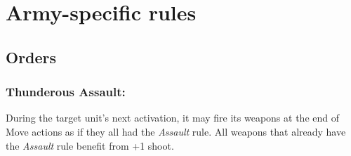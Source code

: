 \newcommand{\Autocannon}[1][3+]{\textbf{Autocannon}: R30 A2 {#1} D4 [Deadly 2, Heavy, Slow]}
\newcommand{\FragLauncher}[1][4+]{\textbf{Frag Launcher}: R20 A6 {#1} D1 [Area Effect, Heavy, Slow]}
\newcommand{\GatlingGun}[1][3+]{\textbf{Gatling Gun}: R20 A3 {#1} D4 [Heavy, Suppressive 2]}
\newcommand{\HeavyBattleRifle}[1][3+]{\textbf{Heavy Battle Rifle}: R30 A2 {#1} D3 [Heavy, Suppressive 1]}
\newcommand{\LaserCannon}[1][3+]{\textbf{Laser Cannon}: R40 {#1} D8 [Critical 9+, Deadly D10, Heavy, Slow]}
\newcommand{\MagmaCannon}[1][4+]{\textbf{Magma Cannon}: R16 {#1} D8 [Critical 8+, Deadly 2D5, Slow]}
\newcommand{\MissileLauncher}[1][3+]{\textbf{Missile Launcher}: R40 {#1} D6 [Deadly D10, Slow] or R40 A4 {#1} D1 [Area Effect, Heavy, Slow]}
\newcommand{\PlasmaCannon}[1][3+]{\textbf{Plasma Cannon}: R30 A3 {#1} D6, [Area Effect, Deadly 2, Heavy, Unstable 1]}
\newcommand{\RocketArtillery}[1][4+]{\textbf{Rocket Artillery}: R10-40 A8 {#1} D2 [Area Effect, Heavy, Indirect Fire, Slow, Suppressive 1]}
\newcommand{\SiegeCannon}[1][3+]{\textbf{Siege Cannon} R4-20 A8 {#1} D8 [Area Effect, Deadly D5+3, Heavy, Slow, Terrifying 1]}
\newcommand{\TankGun}[1][5+]{\textbf{Tank Gun}: R8-40 A6 {#1} D5, [Area Effect, Deadly 2, Heavy]}
\newcommand{\TwinAutocannon}[1][3+]{\textbf{Twin Autocannon}: R30 A4 {#1} D4 [Deadly 2, Heavy, Slow]}
\newcommand{\TwinGatlingGun}[1][3+]{\textbf{Twin Gatling Gun}: R20 A6 {#1} D3 [Heavy, Suppressive 2]}
\newcommand{\TwinHeavyBattleRifle}[1][3+]{\textbf{Twin Heavy Battle Rifle}: R30 A4 {#1} D3 [Heavy, Suppressive 1]}
\newcommand{\TwinHeavyFlamethrower}{\textbf{Twin Heavy Flamethrower}: R8 A10 Autohit D2 [Assault, Slow, Spray, Terrifying 2]}
\newcommand{\TwinLaserCannon}[1][3+]{\textbf{Twin Laser Cannon}: R40 A2 {#1} D8 [Critical 9+, Deadly D10, Heavy, Slow]}





\section*{Army-specific rules}



\subsection*{Orders}

\subsubsection*{Thunderous Assault:} During the target unit's next activation, it may fire its weapons at the end of Move actions as if they all had the \textit{Assault} rule. All weapons that already have the \textit{Assault} rule benefit from +1 shoot.



